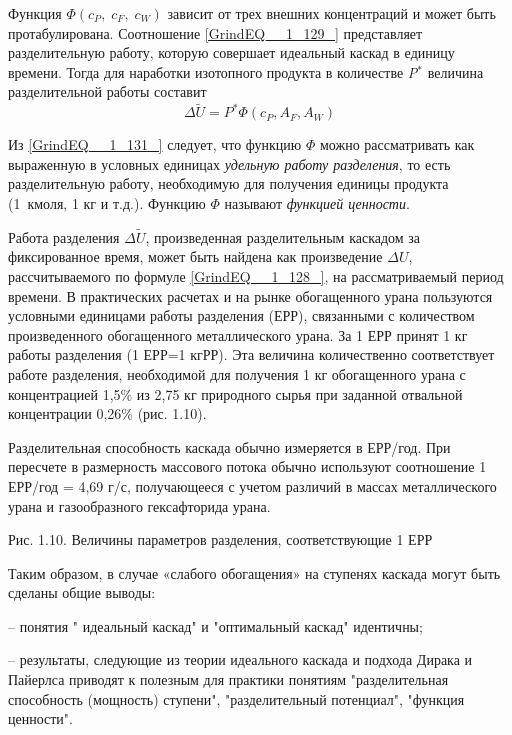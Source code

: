 Функция $\Phi (c_{P} ,\; c_{F} ,\; c_{W} )$ зависит от трех внешних концентраций и может быть протабулирована. Соотношение \ref{GrindEQ__1_129_} представляет разделительную работу, которую совершает идеальный каскад в единицу времени. Тогда для наработки изотопного продукта в количестве \textit{P}${}^{*}$ величина разделительной работы составит
\begin{equation} \label{GrindEQ__1_131_} 
\Delta \tilde{U}=P^{*} \Phi (c_{{P} } ,A_{F} ,A_{W} ) 
\end{equation} 

Из \ref{GrindEQ__1_131_} следует, что функцию $\Phi $ можно рассматривать как выраженную в условных единицах \textit{удельную работу разделения}, то есть разделительную работу, необходимую для получения единицы продукта (1~кмоля, 1 кг и т.д.). Функцию $\Phi $ называют \textit{функцией ценности}.

Работа разделения $\Delta \tilde{U}$, произведенная разделительным каскадом за фиксированное время, может быть найдена как произведение $\Delta U$, рассчитываемого по формуле \ref{GrindEQ__1_128_}, на рассматриваемый период времени. В практических расчетах и на рынке обогащенного урана пользуются условными единицами работы разделения (ЕРР), связанными с количеством произведенного обогащенного металлического урана. За 1 ЕРР принят 1 кг работы разделения (1 ЕРР=1 кгРР). Эта величина количественно соответствует работе разделения, необходимой для получения 1 кг обогащенного урана с концентрацией 1,5\% из 2,75 кг природного сырья при заданной отвальной концентрации 0,26\% (рис. 1.10).

Разделительная способность каскада обычно измеряется в ЕРР/год. При пересчете в размерность массового потока обычно используют соотношение 1 ЕРР/год = 4,69 г/с, получающееся с учетом различий в массах металлического урана и газообразного гексафторида урана.


Рис. 1.10. Величины параметров разделения, соответствующие 1 ЕРР



Таким образом, в случае «слабого обогащения» на ступенях каскада могут быть сделаны общие выводы:

\noindent -- понятия " идеальный каскад" и "оптимальный каскад" идентичны;

\noindent -- результаты, следующие из теории идеального каскада и подхода Дирака и Пайерлса приводят к полезным для практики понятиям "разделительная способность (мощность) ступени", "разделительный потенциал", "функция ценности".

